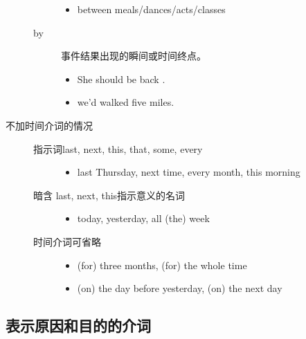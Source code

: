 \begin{description}
\begin{description}
\begin{itemize}
    \item  between meals/dances/acts/classes
    \end{itemize}

  \item[by] 事件结果出现的瞬间或时间终点。
    \begin{itemize}
    \item She should be back .

    \item {} we'd walked five miles.
    \end{itemize}

  \end{description}
\item[不加时间介词的情况]
  \begin{description}
  \item[指示词last, next, this, that, some, every]
    \begin{itemize}
    \item last Thursday, next time, every month, this morning
    \end{itemize}

  \item[暗含 last, next, this指示意义的名词]
    \begin{itemize}
    \item today, yesterday, all (the) week
    \end{itemize}


  \item[时间介词可省略]
    \begin{itemize}
    \item (for) three months, (for) the whole time

    \item (on) the day before yesterday, (on) the next day
    \end{itemize}
  \end{description}
\end{description}



\subsection{表示原因和目的的介词}

